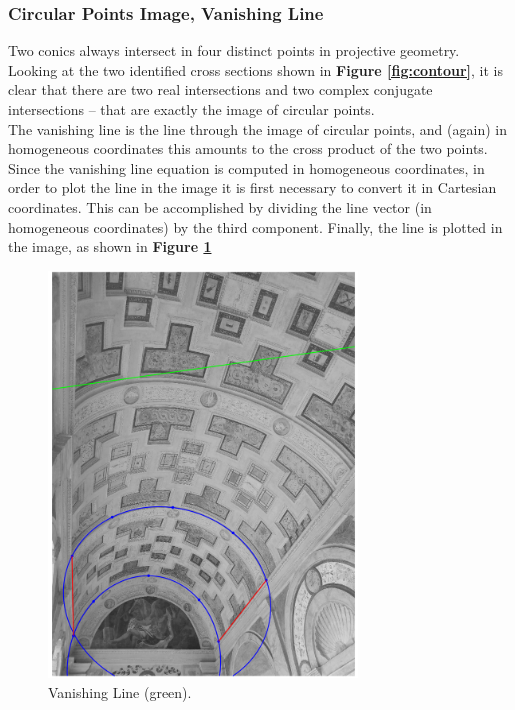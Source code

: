 \documentclass[12pt,a4paper]{article}
\begin{document}
\subsubsection{Circular Points Image, Vanishing Line}\label{sec:toVanishingLine}
Two conics always intersect in four distinct points in projective geometry. Looking at the two identified cross sections shown in \textbf{Figure \ref{fig:contour}}, it is clear that there are two real intersections and two complex conjugate intersections -- that are exactly the image of circular points.\\

The vanishing line is the line through the image of circular points, and (again) in homogeneous coordinates this amounts to the cross product of the two points.\\

Since the vanishing line equation is computed in homogeneous coordinates, in order to plot the line in the image it is first necessary to convert it in Cartesian coordinates. This can be accomplished by dividing the line vector (in homogeneous coordinates) by the third component. Finally, the line is plotted in the image, as shown in \textbf{Figure \ref{fig:vanishingLine}}

\begin{figure}[H]
    \centering
    \includegraphics[width=0.73\textwidth]{Images/PalazzoTe_vanishing_line.png}
    \caption[Vanishing Line.]{Vanishing Line (green).}
    \label{fig:vanishingLine}
\end{figure}
\end{document}

